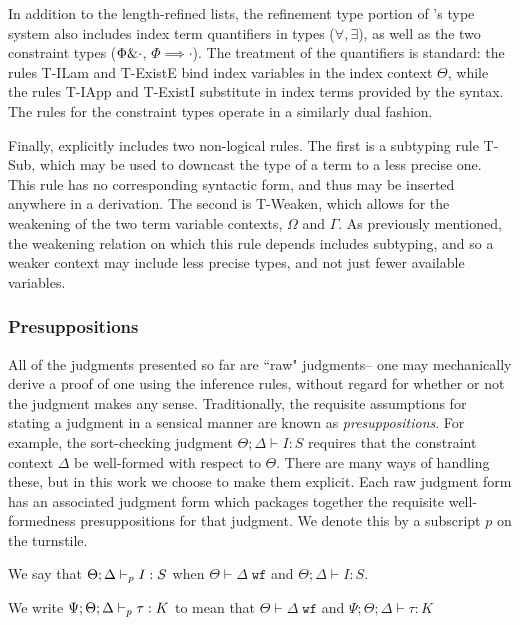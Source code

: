 In addition to the length-refined lists, the refinement type portion of \dlambdaamor's type system also includes index term quantifiers in types ($\forall,\exists$), as well as the two constraint types ($\Phi \& \cdot$, $\Phi \implies \cdot$).  The treatment of the quantifiers is standard: the rules T-ILam and T-ExistE bind index variables in the index context $\Theta$, while the rules T-IApp and T-ExistI substitute in index terms provided by the syntax. The rules for the constraint types operate in a similarly dual fashion.

Finally, \dlambdaamor explicitly includes two non-logical rules. The first is a subtyping rule T-Sub, which may be used to downcast the type of a term to a less precise one. This rule has no corresponding syntactic form, and thus may be inserted anywhere in a derivation. The second is T-Weaken, which allows for the weakening of the two term variable contexts, $\Omega$ and $\Gamma$. As previously mentioned, the weakening relation on which this rule depends includes subtyping, and so a weaker context may include less precise types, and not just fewer available variables.


\subsubsection{Presuppositions}
All of the judgments presented so far are ``raw" judgments-- one may mechanically derive a proof of one using the inference rules, without regard for whether or not the judgment makes any sense. Traditionally, the requisite assumptions for stating a judgment in a sensical manner are known as \textit{presuppositions}. For example, the sort-checking judgment $\Theta ; \Delta \vdash I : S$ requires that the constraint context $\Delta$ be well-formed with respect to $\Theta$. There are many ways of handling these, but in this work we choose to make them explicit. Each raw judgment form has an associated judgment form which packages together the requisite well-formedness presuppositions for that judgment. We denote this by a subscript $p$ on the turnstile.

\begin{definition}
We say that $\Theta ; \Delta \vdash_p I : S$ when $\Theta \vdash \Delta \; \texttt{wf}$ and $\Theta ; \Delta \vdash I : S$.
\end{definition}

\begin{definition}
We write $\Psi ; \Theta ; \Delta \vdash_p \tau : K$ to mean that $\Theta \vdash \Delta \; \texttt{wf}$ and $\Psi ; \Theta ; \Delta \vdash \tau : K$
\end{definition}


